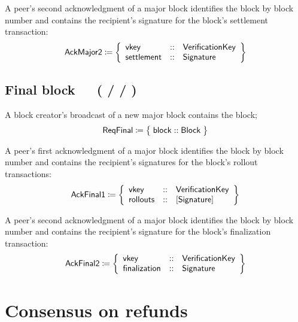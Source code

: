 \documentclass[../hydrozoa.tex]{subfiles}
\begin{document}
A peer's second acknowledgment of a major block identifies the block by block number and contains the recipient's signature for the block's settlement transaction:
\begin{equation*}
  \mathsf{AckMajor2} \coloneq \left\{
  \begin{array}{lll}
    \mathsf{vkey} &::& \mathsf{VerificationKey} \\
    \mathsf{settlement} &::& \mathsf{Signature}
  \end{array}\right\}
\end{equation*}

\subsection{Final block~~~( /  / )}%
\label{h:l2-consensus-final-block}%

A block creator's broadcast of a new major block contains the block;
\begin{equation*}
  \mathsf{ReqFinal} \coloneq \;\bigr\{\; \mathsf{block} :: \mathsf{Block} \;\bigr\}
\end{equation*}

A peer's first acknowledgment of a major block identifies the block by block number and contains the recipient's signatures for the block's rollout transactions:
\begin{equation*}
  \mathsf{AckFinal1} \coloneq \left\{
  \begin{array}{lll}
    \mathsf{vkey} &::& \mathsf{VerificationKey} \\
    \mathsf{rollouts} &::& [\mathsf{Signature}]
  \end{array}\right\}
\end{equation*}

A peer's second acknowledgment of a major block identifies the block by block number and contains the recipient's signature for the block's finalization transaction:
\begin{equation*}
  \mathsf{AckFinal2} \coloneq \left\{
  \begin{array}{lll}
    \mathsf{vkey} &::& \mathsf{VerificationKey} \\
    \mathsf{finalization} &::& \mathsf{Signature}
  \end{array}\right\}
\end{equation*}

\section{Consensus on refunds}%
\label{h:l2-consensus-on-refunds}%
\end{document}
